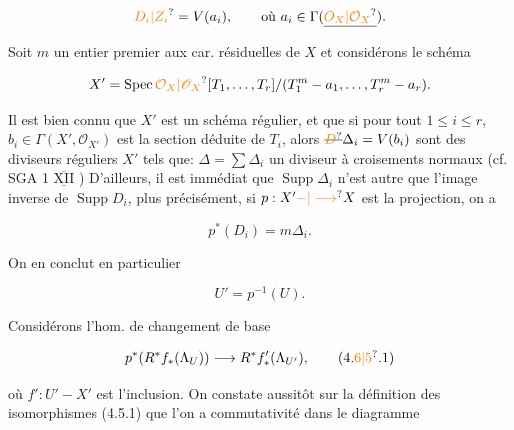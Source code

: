 \[
\unsure{D_i|Z_i}=V(a_i),\qquad\text{où }a_i\in\Gamma(\underline{\unsure{O_X|\mathcal O_X}}).
\]

Soit $m$ un entier premier aux car. résiduelles de $X$  et considérons le schéma

\[
X'=\operatorname{Spec}\unsure{\mathcal O_X|\mathscr O_X}[T_1,\ldots,T_r]/(T_1^m-a_1,\ldots,T_r^m-a_r).
\]

Il est  bien connu que $X'$ est un schéma régulier, et que  si pour tout $1\leq i\leq r$,  $b_i\in\Gamma(X',\mathcal O_{X'})$ est la section déduite de $T_i$, alors  $\deleted{\unsure{D}}\Delta_i=V(b_i)$ sont des diviseurs réguliers  $X'$ tels que: $\Delta=\sum\Delta_i$  un diviseur à croisements normaux (cf. SGA 1 $\overline{\underline{\mathrm{XII}}}$ )  D'ailleurs, il est immédiat que $\operatorname{Supp}\Delta_i$ n'est autre que l'image inverse de $\operatorname{Supp}D_i$, plus précisément, si $p:X'\unsure{{-}|\longrightarrow}X$ est la projection, on a

\[
p^*(D_i)=m\Delta_i.
\]

On en conclut en particulier

\[
U'=p^{-1}(U).
\]

Considérons l'hom.  de changement de base

\[
p^*(R^*f_*(\Lambda_U))\longrightarrow R^*f'_*(\Lambda_{U'}),
\tag*{(4.\unsure{6|5}.1)}
\]

où $f':U'-X'$ est l'inclusion.  On constate  aussitôt sur la définition des isomorphismes (4.5.1) que l'on a commutativité dans le diagramme

